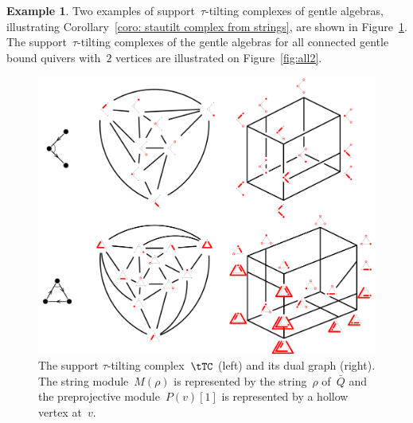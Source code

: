 \documentclass{memo-l}
\theoremstyle{definition}
\newtheorem{example}[theorem]{Example}
\newcommand{\fref}[1]{Figure~\ref{#1}} %
\begin{document}
\begin{example}
Two examples of support~$\tau$-tilting complexes of gentle algebras, illustrating Corollary~\ref{coro: stautilt complex from strings}, are shown in Figure~\ref{fig:exmtTC}.
The support~$\tau$-tilting complexes of the gentle algebras for all connected gentle bound quivers with~$2$ vertices are illustrated on \fref{fig:all2}.


\begin{figure}[p]
	\capstart
	\centerline{\includegraphics[scale=.5]{exmtTC}}
	\caption{The support $\tau$-tilting complex~$\tTC$ (left) and its dual graph (right). The string module~$M(\rho)$ is represented by the string~$\rho$ of~$\bar Q$ and the preprojective module~$P(v)[1]$ is represented by a hollow vertex at~$v$.}
	\label{fig:exmtTC}
\end{figure}
\end{example}
\end{document}
